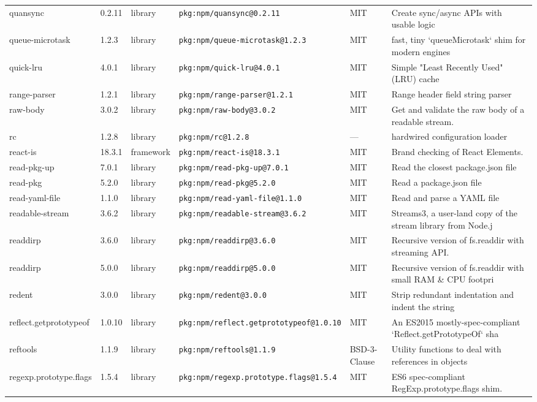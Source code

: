 \documentclass[11pt]{article}
\begin{document}
\begin{longtable}{|l|l|l|p{2.2cm}|l|p{4cm}|}
quansync & 0.2.11 & library & \texttt{pkg:npm/quansync@0.2.11} & MIT & Create sync/async APIs with usable logic \\
queue-microtask & 1.2.3 & library & \texttt{pkg:npm/queue-microtask@1.2.3} & MIT & fast, tiny `queueMicrotask` shim for modern engines \\
quick-lru & 4.0.1 & library & \texttt{pkg:npm/quick-lru@4.0.1} & MIT & Simple "Least Recently Used" (LRU) cache \\
range-parser & 1.2.1 & library & \texttt{pkg:npm/range-parser@1.2.1} & MIT & Range header field string parser \\
raw-body & 3.0.2 & library & \texttt{pkg:npm/raw-body@3.0.2} & MIT & Get and validate the raw body of a readable stream. \\
rc & 1.2.8 & library & \texttt{pkg:npm/rc@1.2.8} & — & hardwired configuration loader \\
react-is & 18.3.1 & framework & \texttt{pkg:npm/react-is@18.3.1} & MIT & Brand checking of React Elements. \\
read-pkg-up & 7.0.1 & library & \texttt{pkg:npm/read-pkg-up@7.0.1} & MIT & Read the closest package.json file \\
read-pkg & 5.2.0 & library & \texttt{pkg:npm/read-pkg@5.2.0} & MIT & Read a package.json file \\
read-yaml-file & 1.1.0 & library & \texttt{pkg:npm/read-yaml-file@1.1.0} & MIT & Read and parse a YAML file \\
readable-stream & 3.6.2 & library & \texttt{pkg:npm/readable-stream@3.6.2} & MIT & Streams3, a user-land copy of the stream library from Node.j \\
readdirp & 3.6.0 & library & \texttt{pkg:npm/readdirp@3.6.0} & MIT & Recursive version of fs.readdir with streaming API. \\
readdirp & 5.0.0 & library & \texttt{pkg:npm/readdirp@5.0.0} & MIT & Recursive version of fs.readdir with small RAM \& CPU footpri \\
redent & 3.0.0 & library & \texttt{pkg:npm/redent@3.0.0} & MIT & Strip redundant indentation and indent the string \\
reflect.getprototypeof & 1.0.10 & library & \texttt{pkg:npm/reflect.getprototypeof@1.0.10} & MIT & An ES2015 mostly-spec-compliant `Reflect.getPrototypeOf` sha \\
reftools & 1.1.9 & library & \texttt{pkg:npm/reftools@1.1.9} & BSD-3-Clause & Utility functions to deal with references in objects \\
regexp.prototype.flags & 1.5.4 & library & \texttt{pkg:npm/regexp.prototype.flags@1.5.4} & MIT & ES6 spec-compliant RegExp.prototype.flags shim. \\

\end{longtable}
\end{document}
